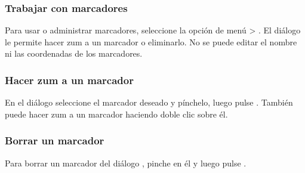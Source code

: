 \subsubsection{Trabajar con marcadores}
Para usar o administrar marcadores, seleccione la opción de 
menú  > .
El diálogo  le permite hacer zum a un marcador o eliminarlo.
No se puede editar el nombre ni las coordenadas de los marcadores.

\subsubsection{Hacer zum a un marcador}
En el diálogo  seleccione el marcador deseado y
pínchelo, luego pulse . También puede hacer zum a un marcador haciendo
doble clic sobre él.

\subsubsection{Borrar un marcador}
Para borrar un marcador del diálogo , pinche en él y luego pulse
 .
